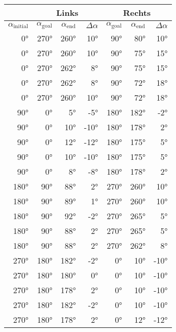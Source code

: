 \begin{tabular}{r||rrr||rrr}
    & \multicolumn{3}{c||}{Links} & \multicolumn{3}{c}{Rechts} \\ \hline
    $\alpha_{\text{initial}}$ & $\alpha_{\text{goal}}$ & $\alpha_{\text{end}}$ & $\Delta\alpha$ & $\alpha_{\text{goal}}$ & $\alpha_{\text{end}}$ & $\Delta\alpha$\\ \hline
    0°   & 270°   & 260°    & 10°   & 90°   & 80°  & 10°  \\
    0°   & 270°   & 260°    & 10°   & 90°   & 75°  & 15°  \\
    0°   & 270°   & 262°    & 8°    & 90°   & 75°  & 15°  \\
    0°   & 270°   & 262°    & 8°    & 90°   & 72°  & 18°  \\
    0°   & 270°   & 260°    & 10°   & 90°   & 72°  & 18°  \\ \hline
    90°  & 0°     & 5°      &-5°    & 180°  & 182° & -2°  \\
    90°  & 0°     & 10°     &-10°   & 180°  & 178° & 2°   \\
    90°  & 0°     & 12°     &-12°   & 180°  & 175° & 5°   \\
    90°  & 0°     & 10°     &-10°   & 180°  & 175° & 5°   \\
    90°  & 0°     & 8°      &-8°    & 180°  & 178° & 2°   \\ \hline
    180° & 90°    & 88°    & 2°     & 270°  & 260°  & 10° \\
    180° & 90°    & 89°    & 1°     & 270°  & 260°  & 10° \\
    180° & 90°    & 92°    & -2°    & 270°  & 265°  & 5°  \\
    180° & 90°    & 88°    & 2°     & 270°  & 265°  & 5°  \\
    180° & 90°    & 88°    & 2°     & 270°  & 262°  & 8°  \\ \hline
    270° & 180°   & 182°   & -2°    & 0°    & 10°   & -10° \\
    270° & 180°   & 180°   & 0°     & 0°    & 10°   & -10° \\
    270° & 180°   & 178°   & 2°     & 0°    & 10°   & -10° \\
    270° & 180°   & 182°   & -2°    & 0°    & 10°   & -10° \\
    270° & 180°   & 178°   & 2°     & 0°    & 12°   & -12°
\end{tabular}
